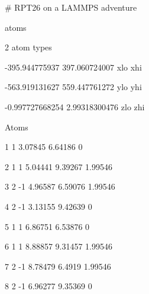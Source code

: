 \begin{tt}

\# RPT26 on a LAMMPS adventure
\par{} atoms

 2 atom types

-395.944775937 397.060724007 xlo xhi

-563.919131627 559.447761272 ylo yhi

-0.997727668254 2.99318300476 zlo zhi


\par\bigskip
Atoms
\par{}  1   1   3.07845   6.64186         0
  

2  1   1   5.04441   9.39267   1.99546

3  2  -1   4.96587   6.59076   1.99546

4  2  -1   3.13155   9.42639         0

5  1   1   6.86751   6.53876         0

6  1   1   8.88857   9.31457   1.99546

7  2  -1   8.78479    6.4919   1.99546

8  2  -1   6.96277   9.35369         0

\end{tt}

